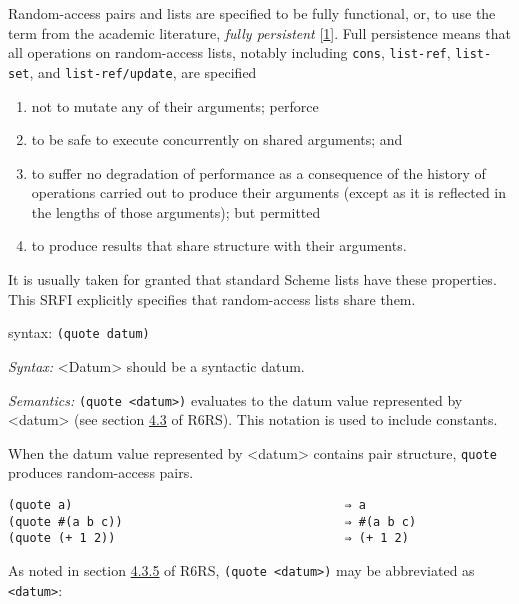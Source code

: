 Random-access pairs and lists are specified to be fully functional, or,
to use the term from the academic literature, \emph{fully persistent}
{[}\protect\hyperlink{note-1}{1}{]}. Full persistence means that all
operations on random-access lists, notably including \texttt{cons},
\texttt{list-ref}, \texttt{list-set}, and \texttt{list-ref/update}, are
specified

\begin{enumerate}
\tightlist
\item
  not to mutate any of their arguments; perforce
\item
  to be safe to execute concurrently on shared arguments; and
\item
  to suffer no degradation of performance as a consequence of the
  history of operations carried out to produce their arguments (except
  as it is reflected in the lengths of those arguments); but permitted
\item
  to produce results that share structure with their arguments.
\end{enumerate}

It is usually taken for granted that standard Scheme lists have these
properties. This SRFI explicitly specifies that random-access lists
share them.

syntax: \texttt{(quote\ datum)}

\emph{Syntax:} \textless{}Datum\textgreater{} should be a syntactic
datum.

\emph{Semantics:} \texttt{(quote\ \textless{}datum\textgreater{})}
evaluates to the datum value represented by
\textless{}datum\textgreater{} (see section
\href{http://www.r6rs.org/final/html/r6rs/r6rs-Z-H-7.html\#node_sec_4.3}{4.3}
of R6RS). This notation is used to include constants.

When the datum value represented by \textless{}datum\textgreater{}
contains pair structure, \texttt{quote} produces random-access pairs.

\begin{verbatim}
(quote a)                                      ⇒ a
(quote #(a b c))                               ⇒ #(a b c)
(quote (+ 1 2))                                ⇒ (+ 1 2)
\end{verbatim}

As noted in section
\href{http://www.r6rs.org/final/html/r6rs/r6rs-Z-H-7.html\#node_sec_4.3.5}{4.3.5}
of R6RS, \texttt{(quote\ \textless{}datum\textgreater{})} may be
abbreviated as
\texttt{\textquotesingle{}\textless{}datum\textgreater{}}:

